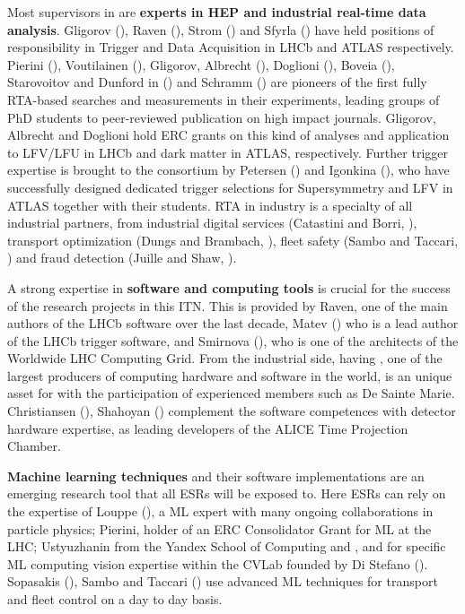 Most supervisors in \acronym are \textbf{experts in HEP and industrial real-time data analysis}. 
Gligorov (\parisUentity), Raven (\nikhefentity), Strom (\oregonentity) and Sfyrla (\unigeentity) have held positions of responsibility in Trigger and Data Acquisition  in LHCb and ATLAS respectively. 
Pierini (\cernentity),  Voutilainen (\helsinkientity), Gligorov, Albrecht (\dortmundentity), Doglioni (\lundentity), Boveia (\ohioentity), Starovoitov and Dunford in (\heidelbergentity) and Schramm (\unigeentity) are pioneers of the first fully RTA-based searches and measurements in their experiments, leading groups of PhD students to peer-reviewed publication on high impact journals. Gligorov, Albrecht and Doglioni hold ERC grants on this kind of analyses and application to LFV/LFU in LHCb and dark matter in ATLAS, respectively. 
Further trigger expertise is brought to the consortium by Petersen (\cern) and Igonkina (\nikhefentity), who have successfully designed dedicated trigger selections for Supersymmetry and LFV in ATLAS together with their students. 
RTA in industry is a specialty of all industrial partners, from industrial digital services (Catastini and Borri, \lightboxentity), transport optimization (Dungs and Brambach, \pointeightentity), fleet safety (Sambo and Taccari, \fleetmaticsentity) and fraud detection (Juille and Shaw, \ibmentity). 

A strong expertise in \textbf{software and computing tools} is crucial for the success of the research projects in this ITN. This is provided by Raven, one of the main authors of the LHCb software over the last decade, Matev (\cernentity) who is a lead author of the LHCb trigger software, and Smirnova (\lundentity), who is one of the architects of the Worldwide LHC Computing Grid. From the industrial side, having \ibmentity, one of the largest producers of computing hardware and software in the world, is an unique asset for \acronym with the participation of experienced members such as De Sainte Marie.  
Christiansen (\lundentity), Shahoyan (\cernentity) complement the software competences with detector hardware expertise, as leading developers of the ALICE Time Projection Chamber.  

\textbf{Machine learning techniques} and their software implementations are an emerging research tool that all ESRs will be exposed to. Here \acronym ESRs can rely on the expertise of Louppe (\liegesentity), a ML expert with many ongoing collaborations in particle physics; Pierini, holder of an ERC Consolidator Grant for ML at the LHC; Ustyuzhanin from the Yandex School of Computing and \cernentity, and for specific ML computing vision expertise within the CVLab founded by Di Stefano (\uniboentity).  Sopasakis (\ximantis), Sambo and Taccari (\fleetmaticsentity) use advanced ML techniques for transport and fleet control on a day to day basis.  

